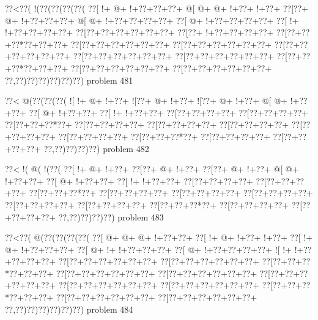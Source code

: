 \vbox{\vbox{\goo
\0??<\0??(\- !(\0??(\0??(\0??(\0??(
\0??[\- !+\- @+\- !+\0??+\0??+\0??+
\- @[\- @+\- @+\- !+\0??+\- !+\0??+
\0??[\0??+\- @+\- !+\0??+\0??+\0??+
\- @[\- @+\- !+\0??+\0??+\0??+\0??+
\0??[\- @+\- !+\0??+\0??+\0??+\0??+
\0??[\- !+\- !+\0??+\0??+\0??+\0??+
\0??[\0??+\0??+\0??+\0??+\0??+\0??+
\0??[\0??+\- !+\0??+\0??+\0??+\0??+
\0??[\0??+\0??+\0??*\0??+\0??+\0??+
\0??[\0??+\0??+\0??+\0??+\0??+\0??+
\0??[\0??+\0??+\0??+\0??+\0??+\0??+
\0??[\0??+\0??+\0??+\0??+\0??+\0??+
\0??[\0??+\0??+\0??+\0??+\0??+\0??+
\0??[\0??+\0??+\0??+\0??+\0??+\0??+
\0??[\0??+\0??+\0??*\0??+\0??+\0??+
\0??[\0??+\0??+\0??+\0??+\0??+\0??+
\0??[\0??+\0??+\0??+\0??+\0??+\0??+
\0??,\0??)\0??)\0??)\0??)\0??)\0??)
}
\hfil problem 481\hfil\break
}

\vbox{\vbox{\goo
\0??<\- @(\0??(\0??(\0??(
\- ![\- !+\- @+\- !+\0??+
\- ![\0??+\- @+\- !+\0??+
\- ![\0??+\- @+\- !+\0??+
\- @[\- @+\- !+\0??+\0??+
\0??[\- @+\- !+\0??+\0??+
\0??[\- !+\- !+\0??+\0??+
\0??[\0??+\0??+\0??+\0??+
\0??[\0??+\0??+\0??+\0??+
\0??[\0??+\0??+\0??*\0??+
\0??[\0??+\0??+\0??+\0??+
\0??[\0??+\0??+\0??+\0??+
\0??[\0??+\0??+\0??+\0??+
\0??[\0??+\0??+\0??+\0??+
\0??[\0??+\0??+\0??+\0??+
\0??[\0??+\0??+\0??*\0??+
\0??[\0??+\0??+\0??+\0??+
\0??[\0??+\0??+\0??+\0??+
\0??,\0??)\0??)\0??)\0??)
}
\hfil problem 482\hfil\break
}

\vbox{\vbox{\goo
\0??<\- !(\- @(\- !(\0??(
\0??[\- !+\- @+\- !+\0??+
\0??[\0??+\- @+\- !+\0??+
\0??[\0??+\- @+\- !+\0??+
\- @[\- @+\- !+\0??+\0??+
\0??[\- @+\- !+\0??+\0??+
\0??[\- !+\- !+\0??+\0??+
\0??[\0??+\0??+\0??+\0??+
\0??[\0??+\0??+\0??+\0??+
\0??[\0??+\0??+\0??*\0??+
\0??[\0??+\0??+\0??+\0??+
\0??[\0??+\0??+\0??+\0??+
\0??[\0??+\0??+\0??+\0??+
\0??[\0??+\0??+\0??+\0??+
\0??[\0??+\0??+\0??+\0??+
\0??[\0??+\0??+\0??*\0??+
\0??[\0??+\0??+\0??+\0??+
\0??[\0??+\0??+\0??+\0??+
\0??,\0??)\0??)\0??)\0??)
}
\hfil problem 483\hfil\break
}

\vbox{\vbox{\goo
\0??<\0??(\- @(\0??(\0??(\0??(\0??(
\0??[\- @+\- @+\- @+\- !+\0??+\0??+
\0??[\- !+\- @+\- !+\0??+\- !+\0??+
\0??[\- !+\- @+\- !+\0??+\0??+\0??+
\0??[\- @+\- !+\- !+\0??+\0??+\0??+
\0??[\- @+\- !+\0??+\0??+\0??+\0??+
\- ![\- !+\- !+\0??+\0??+\0??+\0??+
\0??[\0??+\0??+\0??+\0??+\0??+\0??+
\0??[\0??+\0??+\0??+\0??+\0??+\0??+
\0??[\0??+\0??+\0??*\0??+\0??+\0??+
\0??[\0??+\0??+\0??+\0??+\0??+\0??+
\0??[\0??+\0??+\0??+\0??+\0??+\0??+
\0??[\0??+\0??+\0??+\0??+\0??+\0??+
\0??[\0??+\0??+\0??+\0??+\0??+\0??+
\0??[\0??+\0??+\0??+\0??+\0??+\0??+
\0??[\0??+\0??+\0??*\0??+\0??+\0??+
\0??[\0??+\0??+\0??+\0??+\0??+\0??+
\0??[\0??+\0??+\0??+\0??+\0??+\0??+
\0??,\0??)\0??)\0??)\0??)\0??)\0??)
}
\hfil problem 484\hfil\break
}

